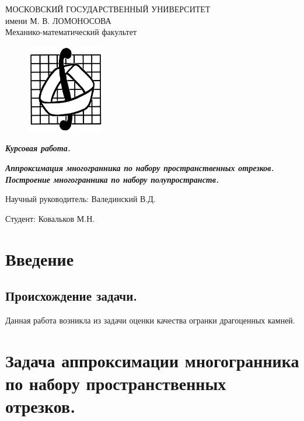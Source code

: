 \documentclass[14pt,fleqn,a4paper]{scrartcl}
\begin{document}
\begin{center}
МОСКОВСКИЙ ГОСУДАРСТВЕННЫЙ УНИВЕРСИТЕТ \\ имени М. В. ЛОМОНОСОВА\\ Механико-математический факультет
\end{center}
\begin{figure}[htbp]
\centering
\includegraphics[width=0.3\textwidth]{36cacac6.png}
\end{figure}
\begin{center}
\textbf{\large{\textit{Курсовая работа.}}}
\end{center} 
\textbf{\large{\textit{Аппроксимация многогранника по набору пространственных отрезков. Построение многогранника по набору полупространств.}}} \\
\begin{flushright} {Научный руководитель: Валединский В.Д.\\ }\end{flushright}
\begin{flushright} {Студент: Ковальков М.Н.\\ }\end{flushright}
\newpage 
\tableofcontents
\newpage
\section{Введение}
\subsection{Происхождение задачи.}
Данная работа возникла из задачи оценки качества огранки драгоценных камней. 
\section{Задача аппроксимации многогранника по набору пространственных отрезков.}
\end{document}
